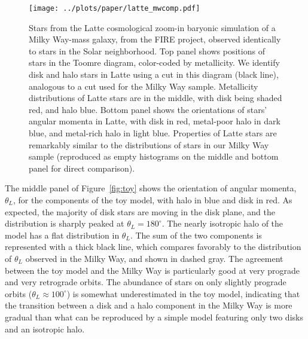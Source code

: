\documentclass[apj, twocolappendix, numberedappendix, appendixfloats]{emulateapj}
\begin{document}
\begin{figure}
\begin{center}
\texttt{[image: ../plots/paper/latte\_mwcomp.pdf]}
\caption{Stars from the Latte cosmological zoom-in baryonic simulation of a Milky Way-mass galaxy, from the FIRE project, observed identically to stars in the Solar neighborhood.
Top panel shows positions of stars in the Toomre diagram, color-coded by metallicity.
We identify disk and halo stars in Latte using a cut in this diagram (black line), analogous to a cut used for the Milky Way sample.
Metallicity distributions of Latte stars are in the middle, with disk being shaded red, and halo blue.
Bottom panel shows the orientations of stars' angular momenta in Latte, with disk in red, metal-poor halo in dark blue, and metal-rich halo in light blue.
Properties of Latte stars are remarkably similar to the distributions of stars in our Milky Way sample (reproduced as empty histograms on the middle and bottom panel for direct comparison).
}
\label{fig:latte}
\end{center}
\end{figure}

The middle panel of Figure~\ref{fig:toy} shows the orientation of angular momenta, $\theta_L$, for the components of the toy model, with halo in blue and disk in red.
As expected, the majority of disk stars are moving in the disk plane, and the distribution is sharply peaked at $\theta_L=180^\circ$.
The nearly isotropic halo of the \citet{bensby2003} model has a flat distribution in $\theta_L$.
The sum of the two components is represented with a thick black line, which compares favorably to the distribution of $\theta_L$ observed in the Milky Way, and shown in dashed gray.
The agreement between the toy model and the Milky Way is particularly good at very prograde and very retrograde orbits.
The abundance of stars on only slightly prograde orbits ($\theta_L\approx100^\circ$) is somewhat underestimated in the toy model, indicating that the transition between a disk and a halo component in the Milky Way is more gradual than what can be reproduced by a simple model featuring only two disks and an isotropic halo.
\end{document}
